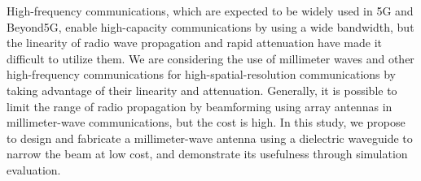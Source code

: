 \documentclass[a4paper,12pt]{report}
\begin{document}
High-frequency communications, which are expected to be widely used in 5G and Beyond5G, enable high-capacity communications by using a wide bandwidth, but the linearity of radio wave propagation and rapid attenuation have made it difficult to utilize them. We are considering the use of millimeter waves and other high-frequency communications for high-spatial-resolution communications by taking advantage of their linearity and attenuation. Generally, it is possible to limit the range of radio propagation by beamforming using array antennas in millimeter-wave communications, but the cost is high. In this study, we propose to design and fabricate a millimeter-wave antenna using a dielectric waveguide to narrow the beam at low cost, and demonstrate its usefulness through simulation evaluation.
\end{document}
